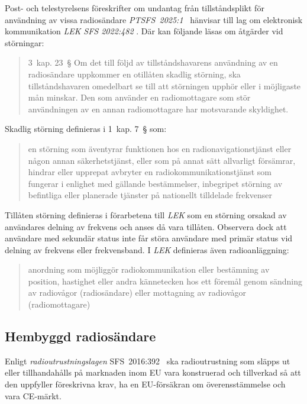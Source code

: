 Post- och telestyrelsens föreskrifter om undantag från tillståndsplikt för
användning av vissa radiosändare \emph{PTSFS~2025:1}~\cite{PTSFS2025:1}
hänvisar till lag om elektronisk kommunikation \emph{LEK} \emph{SFS 2022:482}
\cite{SFS2022:482}.
Där kan följande läsas om åtgärder vid störningar:
\begin{quote}
	3~kap. 23~\S{} Om det till följd av tillståndshavarens användning av en
	radiosändare uppkommer en otillåten skadlig störning, ska tillståndshavaren
	omedelbart se till att störningen upphör eller i möjligaste mån minskar.
	Den som använder en radiomottagare som stör användningen av en annan
	radiomottagare har motsvarande skyldighet.
\end{quote}
Skadlig störning definieras i 1~kap. 7~\S{} som:
\begin{quote}
	en störning som äventyrar funktionen hos en radionavigationstjänst eller
	någon annan säkerhetstjänst, eller som på annat sätt allvarligt försämrar,
	hindrar eller upprepat avbryter en radiokommunikationstjänst som fungerar i
	enlighet med gällande bestämmelser, inbegripet störning av befintliga eller
	planerade tjänster på nationellt tilldelade frekvenser
\end{quote}
Tillåten störning definieras i förarbetena till \emph{LEK} som en störning
orsakad av användares delning av frekvens och anses då vara tillåten.
Observera dock att användare med sekundär status inte får störa användare med
primär status vid delning av frekvens eller frekvensband.
I \emph{LEK} definieras även radioanläggning:
\begin{quote}
	anordning som möjliggör radiokommunikation eller bestämning av position,
	hastighet eller andra kännetecken hos ett föremål genom sändning av radiovågor
	(radiosändare) eller mottagning av radiovågor (radiomottagare)
\end{quote}

\newpage
{} 

\subsection{Hembyggd radiosändare}
\label{hembyggd radiosandare}
\label{radioutrustningslagen}

Enligt \emph{radioutrustningslagen} SFS~2016:392~\cite{SFS2016:392} ska
radioutrustning som släpps ut eller tillhandahålls på marknaden inom EU vara
konstruerad och tillverkad så att den uppfyller föreskrivna krav, ha en
EU-försäkran om överensstämmelse och vara CE-märkt.


